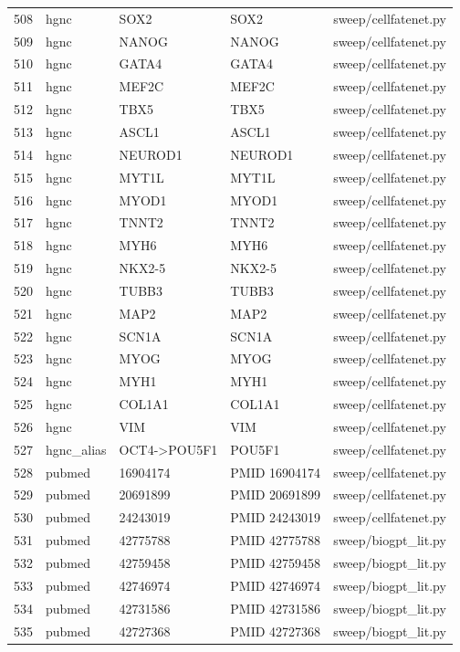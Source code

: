 {\begin{longtable}{rllp{3.2cm}p{4.2cm}}
508 & hgnc & SOX2 & SOX2 & sweep/cellfatenet.py\\
509 & hgnc & NANOG & NANOG & sweep/cellfatenet.py\\
510 & hgnc & GATA4 & GATA4 & sweep/cellfatenet.py\\
511 & hgnc & MEF2C & MEF2C & sweep/cellfatenet.py\\
512 & hgnc & TBX5 & TBX5 & sweep/cellfatenet.py\\
513 & hgnc & ASCL1 & ASCL1 & sweep/cellfatenet.py\\
514 & hgnc & NEUROD1 & NEUROD1 & sweep/cellfatenet.py\\
515 & hgnc & MYT1L & MYT1L & sweep/cellfatenet.py\\
516 & hgnc & MYOD1 & MYOD1 & sweep/cellfatenet.py\\
517 & hgnc & TNNT2 & TNNT2 & sweep/cellfatenet.py\\
518 & hgnc & MYH6 & MYH6 & sweep/cellfatenet.py\\
519 & hgnc & NKX2-5 & NKX2-5 & sweep/cellfatenet.py\\
520 & hgnc & TUBB3 & TUBB3 & sweep/cellfatenet.py\\
521 & hgnc & MAP2 & MAP2 & sweep/cellfatenet.py\\
522 & hgnc & SCN1A & SCN1A & sweep/cellfatenet.py\\
523 & hgnc & MYOG & MYOG & sweep/cellfatenet.py\\
524 & hgnc & MYH1 & MYH1 & sweep/cellfatenet.py\\
525 & hgnc & COL1A1 & COL1A1 & sweep/cellfatenet.py\\
526 & hgnc & VIM & VIM & sweep/cellfatenet.py\\
527 & hgnc\_alias & OCT4->POU5F1 & POU5F1 & sweep/cellfatenet.py\\
528 & pubmed & 16904174 & PMID 16904174 & sweep/cellfatenet.py\\
529 & pubmed & 20691899 & PMID 20691899 & sweep/cellfatenet.py\\
530 & pubmed & 24243019 & PMID 24243019 & sweep/cellfatenet.py\\
531 & pubmed & 42775788 & PMID 42775788 & sweep/biogpt\_lit.py\\
532 & pubmed & 42759458 & PMID 42759458 & sweep/biogpt\_lit.py\\
533 & pubmed & 42746974 & PMID 42746974 & sweep/biogpt\_lit.py\\
534 & pubmed & 42731586 & PMID 42731586 & sweep/biogpt\_lit.py\\
535 & pubmed & 42727368 & PMID 42727368 & sweep/biogpt\_lit.py\\

\end{longtable}}
